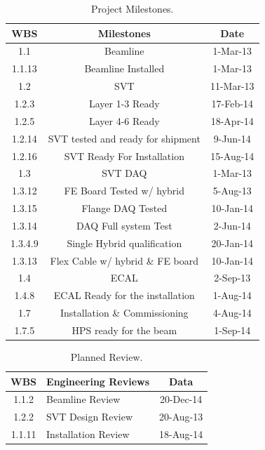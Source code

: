 \begin{table}[htdp]
\caption{Project Milestones.}
\begin{center}
\begin{tabular}{|c|c|c|}
\hline
WBS & Milestones & Date\\
\hline\hline

1.1	&Beamline	&1-Mar-13\\
\hline
1.1.13	&Beamline Installed	&1-Mar-13\\
\hline
1.2	&SVT	&11-Mar-13\\
\hline
1.2.3	&Layer 1-3 Ready	&17-Feb-14\\
\hline
1.2.5	&Layer 4-6 Ready	&18-Apr-14\\
\hline
1.2.14	&SVT tested and ready for shipment	&9-Jun-14\\
\hline
1.2.16	&SVT Ready For Installation	&15-Aug-14\\
\hline
1.3	&SVT DAQ	&1-Mar-13\\
\hline
1.3.12	&FE Board Tested w/ hybrid	&5-Aug-13\\
\hline
1.3.15	&Flange DAQ Tested	&10-Jan-14\\
\hline
1.3.14	&DAQ Full system Test	&2-Jun-14\\
\hline
1.3.4.9	&Single Hybrid qualification	&20-Jan-14\\
\hline
1.3.13	&Flex Cable w/ hybrid \& FE board	&10-Jan-14\\
\hline
1.4	&ECAL	&2-Sep-13\\
\hline
1.4.8	&ECAL Ready for the installation	&1-Aug-14\\
\hline
1.7	&Installation \& Commissioning	&4-Aug-14\\
\hline
1.7.5	&HPS ready for the beam	&1-Sep-14\\
\hline
\hline
\end{tabular}
\end{center}
\label{tb:milestones}
\end{table}%

\begin{table}[htdp]
\caption{Planned Review.}
\begin{center}
\begin{tabular}{|c|l|c|}
\hline
WBS&Engineering Reviews& Data\\
\hline
\hline
1.1.2 &	Beamline  Review&	20-Dec-14\\
\hline
1.2.2	&SVT Design Review	&20-Aug-13\\
\hline
1.1.11&	Installation Review	&18-Aug-14\\
\hline
\hline
\end{tabular}
\end{center}
\label{tb:reviews}
\end{table}%

